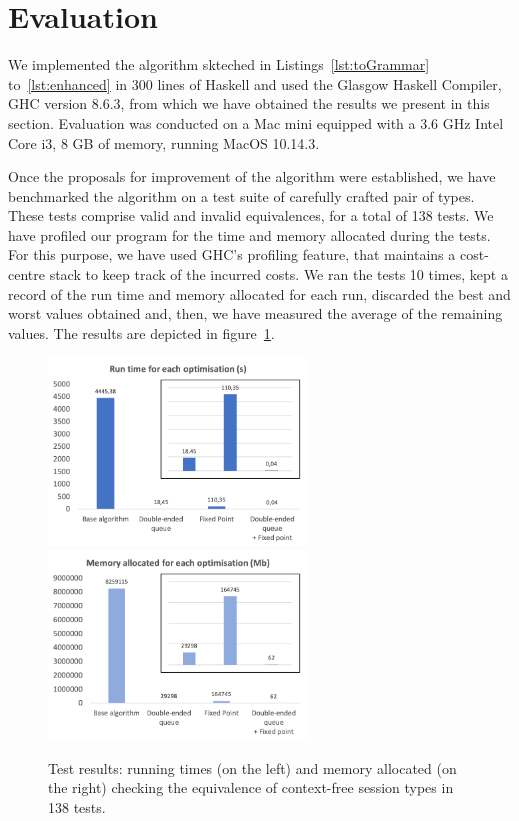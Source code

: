 \section{Evaluation}
\label{sec:evaluation}


We implemented the algorithm skteched in Listings~\ref{lst:toGrammar}
to~\ref{lst:enhanced} in 300 lines of Haskell and used the Glasgow
Haskell Compiler, GHC version 8.6.3, from which we have obtained the
results we present in this section.  Evaluation was conducted on a Mac
mini equipped with a 3.6 GHz Intel Core i3, 8 GB of memory, running
MacOS 10.14.3.

Once the proposals for improvement of the algorithm were established,
we have benchmarked the algorithm on a test suite of carefully crafted
pair of types. These tests comprise valid and invalid equivalences,
for a total of 138 tests. We have profiled our program for the
time and memory allocated during the tests. For this purpose,
we have used GHC's profiling feature, that maintains a cost-centre stack
to keep track of the incurred costs. We ran the tests 10 times,
kept a record of the run time and memory allocated for each run,
discarded the best and worst values obtained and, then, we have
measured the average of the remaining values. The results are
depicted in figure~\ref{fig:results}.

\begin{figure}[h]
	\includegraphics[height=5cm]{img/run_time}	\enspace
	\includegraphics[height=5cm]{img/memory_alloc}
	\caption{Test results: running times (on the left) and
	memory allocated (on the right) checking the equivalence
	of context-free session types in 138 tests.}
	\label{fig:results}
\end{figure}

